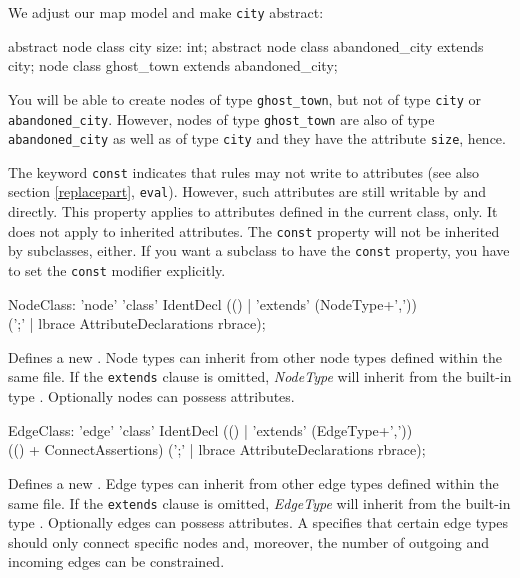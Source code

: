 \begin{example}
We adjust our map model and make \texttt{city} abstract:
\begin{grgen}
abstract node class city {
	size: int;
}
abstract node class abandoned_city extends city;
node class ghost_town extends abandoned_city;
\end{grgen}
You will be able to create nodes of type \texttt{ghost\_town}, but not of type \texttt{city} or \texttt{abandoned\_city}. However, nodes of type \texttt{ghost\_town} are also of type \texttt{abandoned\_city} as well as of type \texttt{city} and they have the attribute \texttt{size}, hence.
\end{example}
The keyword \texttt{const} indicates that rules may not write to attributes (see also section \ref{replacepart}, \texttt{eval}). However, such attributes are still writable by \LibGr{} and \GrShell{} directly. This property applies to attributes defined in the current class, only. It does not apply to inherited attributes. The \texttt{const} property will not be inherited by subclasses, either. If you want a subclass to have the \texttt{const} property, you have to set the \texttt{const} modifier explicitly.

\begin{rail}  
  NodeClass: 'node' 'class' IdentDecl (() | 'extends' (NodeType+',')) \\ 
    (';' | lbrace AttributeDeclarations rbrace);
\end{rail}
Defines a new . Node types can inherit from other node types defined within the same file. If the \texttt{extends} clause is omitted, \emph{NodeType} will inherit from the built-in type \texttt{}. Optionally nodes can possess attributes.

\begin{rail}    
  EdgeClass: 'edge' 'class' IdentDecl (() | 'extends' (EdgeType+',')) \\
    (() + ConnectAssertions) (';' | lbrace AttributeDeclarations rbrace);
\end{rail}
Defines a new . Edge types can inherit from other edge types defined within the same file. If the \texttt{extends} clause is omitted, \emph{EdgeType} will inherit from the built-in type \texttt{}. Optionally edges can possess attributes. A  specifies that certain edge types should only connect specific nodes and, moreover, the number of outgoing and incoming edges can be constrained.

